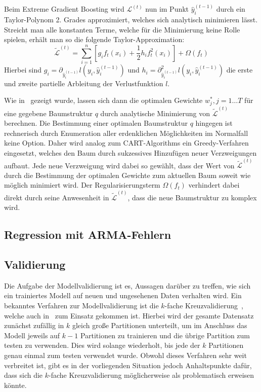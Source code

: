 Beim Extreme Gradient Boosting wird $\mathcal{L}^{(t)}$ nun im Punkt $\hat{y}^{(t-1)}_i$ durch ein Taylor-Polynom 2. Grades
approximiert, welches sich analytisch minimieren l\"asst.
Streicht man alle konstanten Terme, welche f\"ur die Minimierung keine Rolle spielen, erh\"alt man so die folgende Taylor-Approximation:
\begin{equation}
    \tilde{\mathcal{L}}^{(t)} = \sum_{i=1}^{n} \left[ g_i f_t(x_i) + \frac{1}{2}h_i f_t^2(x_i) \right] + \Omega(f_t)
\end{equation}
Hierbei sind $g_i = \partial_{\hat{y}_i^{(t-1)}} l(y_i, \hat{y}_i^{(t-1)})$ und 
$h_i = \partial_{\hat{y}_i^{(t-1)}}^2 l(y_i, \hat{y}_i^{(t-1)})$ die erste und zweite partielle Arbleitung der Verlustfunktion
$l$.

Wie in~\cite{XGBoost} gezeigt wurde, lassen sich dann die optimalen Gewichte $w_j^*, j=1 \ldots T$ f\"ur eine gegebene Baumstruktur
$q$ durch analytische Minimierung von $\tilde{\mathcal{L}}^{(t)}$ berechnen.
Die Bestimmung einer optimalen Baumstruktur $q$ hingegen ist rechnerisch durch Enumeration aller erdenklichen M\"oglichkeiten im
Normalfall keine Option.
Daher wird analog zum CART-Algorithms ein Greedy-Verfahren eingesetzt, welches den Baum durch sukzessives Hinzuf\"ugen neuer
Verzweigungen aufbaut.
Jede neue Verzweigung wird dabei so gew\"ahlt, dass der Wert von $\tilde{\mathcal{L}}^{(t)}$ durch die Bestimmung der optimalen
Gewichte zum aktuellen Baum soweit wie m\"oglich minimiert wird.
Der Regularisierungsterm $\Omega(f_t)$ verhindert dabei direkt durch seine Anwesenheit in $\tilde{\mathcal{L}}^{(t)}$, dass die neue
Baumstruktur zu komplex wird.

\subsection{Regression mit ARMA-Fehlern}

\subsection{Validierung}

Die Aufgabe der Modellvalidierung ist es, Aussagen dar\"uber zu treffen, wie sich ein trainiertes Modell auf neuen und ungesehenen Daten
verhalten wird.
Ein bekanntes Verfahren zur Modellvalidierung ist die $k$-fache Kreuzvalidierung~\cite{elements}, welche auch in~\cite{IEEE} zum Einsatz
gekommen ist.
Hierbei wird der gesamte Datensatz zun\"achst zuf\"allig in $k$ gleich gro{\ss}e Partitionen unterteilt,
um im Anschluss das Modell jeweils auf $k-1$ Partitionen
zu trainieren und die \"ubrige Partition zum testen zu verwenden. Dies wird solange wiederholt, bis jede der
$k$ Partitionen genau einmal zum testen verwendet wurde.
Obwohl dieses Verfahren sehr weit verbreitet ist, gibt es in der vorliegenden Situation jedoch Anhaltspunkte daf\"ur,
dass sich die $k$-fache Kreuzvalidierung m\"oglicherweise als problematisch erweisen k\"onnte.

